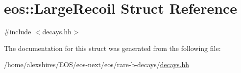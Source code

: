 \hypertarget{structeos_1_1LargeRecoil}{
\section{eos::LargeRecoil Struct Reference}
\label{structeos_1_1LargeRecoil}
}


{\ttfamily \#include $<$decays.hh$>$}

The documentation for this struct was generated from the following file:\begin{DoxyCompactItemize}
\item 
/home/alexshires/EOS/eos-\/next/eos/rare-\/b-\/decays/\hyperlink{decays_8hh}{decays.hh}\end{DoxyCompactItemize}
